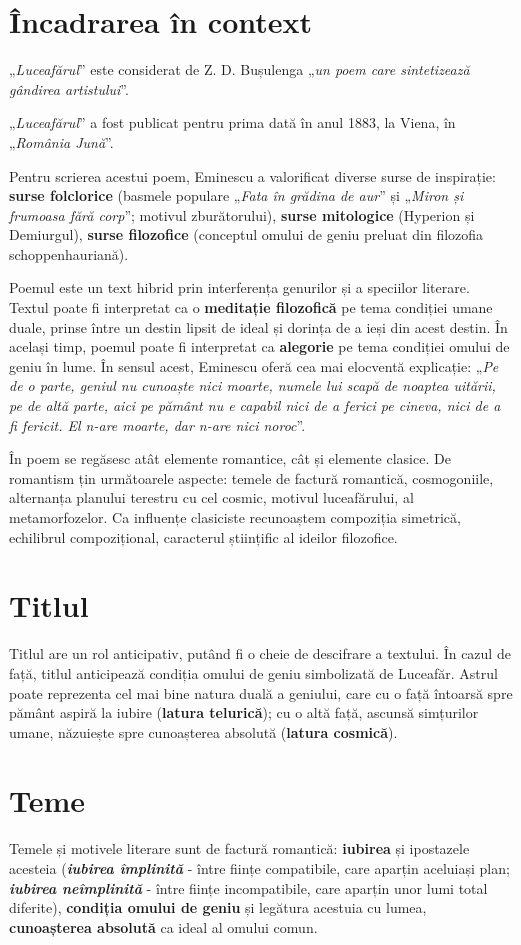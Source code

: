 \documentclass{article}
\newcommand{\qu}[1]{„\emph{#1}”}
\begin{document}
\section{Încadrarea în context}
\qu{Luceafărul} este considerat de Z. D. Bușulenga \qu{un poem care sintetizează gândirea artistului}.

\qu{Luceafărul} a fost publicat pentru prima dată în anul 1883, la Viena, în \qu{România Jună}.

Pentru scrierea acestui poem, Eminescu a valorificat diverse surse de inspirație: \textbf{surse folclorice} (basmele populare \qu{Fata în grădina de aur} și \qu{Miron și frumoasa fără corp}; motivul zburătorului), \textbf{surse mitologice} (Hyperion și Demiurgul), \textbf{surse filozofice} (conceptul omului de geniu preluat din filozofia schoppenhauriană).

Poemul este un text hibrid prin interferența genurilor și a speciilor literare. Textul poate fi interpretat ca o \textbf{meditație filozofică} pe tema condiției umane duale, prinse între un destin lipsit de ideal și dorința de a ieși din acest destin. În același timp, poemul poate fi interpretat ca \textbf{alegorie} pe tema condiției omului de geniu în lume. În sensul acest, Eminescu oferă cea mai elocventă explicație: \qu{Pe de o parte, geniul nu cunoaște nici moarte, numele lui scapă de noaptea uitării, pe de altă parte, aici pe pământ nu e capabil nici de a ferici pe cineva, nici de a fi fericit. El n-are moarte, dar n-are nici noroc}.

În poem se regăsesc atât elemente romantice, cât și elemente clasice. De romantism țin următoarele aspecte: temele de factură romantică, cosmogoniile, alternanța planului terestru cu cel cosmic, motivul luceafărului, al metamorfozelor. Ca influențe clasiciste recunoaștem compoziția simetrică, echilibrul compozițional, caracterul științific al ideilor filozofice.
\section{Titlul}
Titlul are un rol anticipativ, putând fi o cheie de descifrare a textului. În cazul de față, titlul anticipează condiția omului de geniu simbolizată de Luceafăr. Astrul poate reprezenta cel mai bine natura duală a geniului, care cu o față întoarsă spre pământ aspiră la iubire (\textbf{latura telurică}); cu o altă față, ascunsă simțurilor umane, năzuiește spre cunoașterea absolută (\textbf{latura cosmică}).

\section{Teme}
Temele și motivele literare sunt de factură romantică: \textbf{iubirea} și ipostazele acesteia (\textsl{\textbf{iubirea împlinită}} - între ființe compatibile, care aparțin aceluiași plan; \textsl{\textbf{iubirea neîmplinită}} - între ființe incompatibile, care aparțin unor lumi total diferite), \textbf{condiția omului de geniu} și legătura acestuia cu lumea, \textbf{cunoașterea absolută} ca ideal al omului comun.
\end{document}
